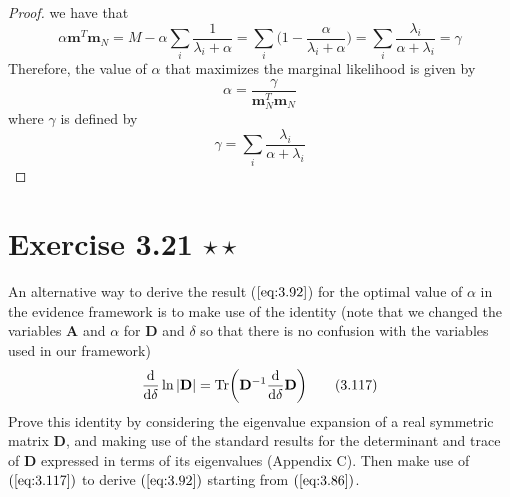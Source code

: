 \begin{proof}
    we have that
    \[
        \alpha \mathbf{m}^T\mathbf{m}_N 
        = M - \alpha \sum_i \frac{1}{\lambda_i + \alpha}
        = \sum_i \bigg(1 - \frac{\alpha}{\lambda_i + \alpha}\bigg)
        = \sum_i \frac{\lambda_i}{\alpha + \lambda_i}
        = \gamma
    \] 
    Therefore, the value of $\alpha$ that maximizes the marginal likelihood
    is given by 
    \begin{equation*}
        \alpha = \frac{\gamma}{\mathbf{m}_N^T\mathbf{m}_N}
        \tag{3.92}\label{eq:3.92}
    \end{equation*}
    where $\gamma$ is defined by
    \begin{equation*}
        \gamma = \sum_i \frac{\lambda_i}{\alpha + \lambda_i}
        \tag{3.91}\label{eq:3.91}
    \end{equation*}
\end{proof}

\section*{Exercise 3.21 $\star \star$}
An alternative way to derive the result ($\ref{eq:3.92}$) for the optimal
value of $\alpha$ in the evidence framework is to make use of the identity
(note that we changed the variables $\mathbf{A}$ and $\alpha$ for $\mathbf{D}$ and
$\delta$ so that there is no confusion with the variables used in our 
framework)
\begin{equation*}
    \dv{\delta} \ln |\mathbf{D}| = \text{Tr}\bigg(\mathbf{D}^{-1}\dv{\delta}\mathbf{D}\bigg)
    \tag{3.117}\label{eq:3.117}
\end{equation*}
Prove this identity by considering the eigenvalue expansion of a real
symmetric matrix $\mathbf{D}$, and making use of the standard results
for the determinant and trace of $\mathbf{D}$ expressed in terms of 
its eigenvalues (Appendix C). Then make use of $(\ref{eq:3.117})$ to
derive $(\ref{eq:3.92})$ starting from $(\ref{eq:3.86})$.

\vspace{1em}

